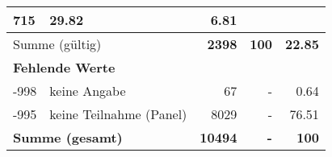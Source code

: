 \begin{longtable}{lXrrr}
       \num{715} &
       \num[round-mode=places,round-precision=2]{29,82} &
         \num[round-mode=places,round-precision=2]{6,81} \\
     \midrule
     \multicolumn{2}{l}{Summe (gültig)} &
       \textbf{\num{2398}} &
     \textbf{100} &
       \textbf{\num[round-mode=places,round-precision=2]{22,85}} \\
     \multicolumn{5}{l}{\textbf{Fehlende Werte}}\\
       -998 &
       keine Angabe &
         \num{67} &
        - &
         \num[round-mode=places,round-precision=2]{0,64} \\
       -995 &
       keine Teilnahme (Panel) &
         \num{8029} &
        - &
         \num[round-mode=places,round-precision=2]{76,51} \\
     \midrule
     \multicolumn{2}{l}{\textbf{Summe (gesamt)}} &
          \textbf{\num{10494}} &
        \textbf{-} &
        \textbf{100} \\
     \bottomrule
     \end{longtable}
     
